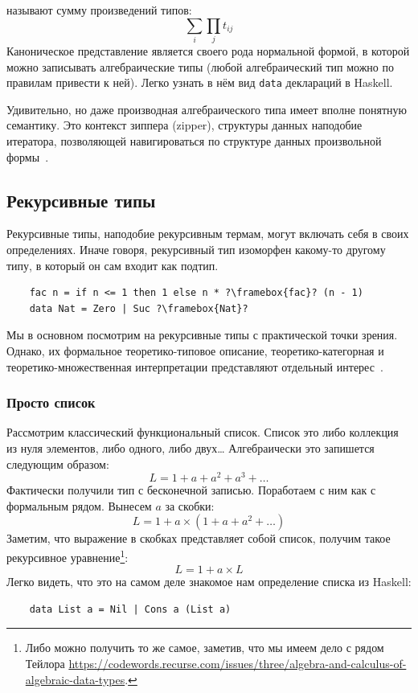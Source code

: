  называют сумму произведений типов:
\[
    \sum_{i}\prod_{j} t_{ij}
\]
Каноническое представление является своего рода нормальной формой, в которой можно записывать алгебраические типы (любой алгебраический тип можно по правилам привести к ней).
Легко узнать в нём вид \texttt{data} деклараций в Haskell.

Удивительно, но даже производная алгебраического типа имеет вполне понятную семантику.
Это контекст зиппера (zipper), структуры данных наподобие итератора, позволяющей навигироваться по структуре данных произвольной формы~\cite{huet1997zipper, mcbride2001derivative, abbott2003derivatives}.

\subsection{Рекурсивные типы} \label{subsec:recursive-types}

Рекурсивные типы, наподобие рекурсивным термам, могут включать себя в своих определениях.
Иначе говоря, рекурсивный тип изоморфен какому-то другому типу, в который он сам входит как подтип.
\begin{verbatim}
    fac n = if n <= 1 then 1 else n * ?\framebox{fac}? (n - 1)
    data Nat = Zero | Suc ?\framebox{Nat}?
\end{verbatim}

Мы в основном посмотрим на рекурсивные типы с практической точки зрения.
Однако, их формальное теоретико-типовое описание, теоретико-категорная и теоретико-множественная интерпретации представляют отдельный интерес~\cite[часть 4]{pierce2002types}.

\subsubsection{Просто список}

Рассмотрим классический функциональный список.
Список это либо коллекция из нуля элементов, либо одного, либо двух\ldots
Алгебраически это запишется следующим образом:
\[
    L = 1 + a + a^2 + a^3 + \ldots
\]
Фактически получили тип с бесконечной записью.
Поработаем с ним как с формальным рядом.
Вынесем $a$ за скобки:
\[
    L = 1 + a \times (1 + a + a^2 + \ldots)
\]
Заметим, что выражение в скобках представляет собой список, получим такое рекурсивное уравнение\footnote{Либо можно получить то же самое, заметив, что мы имеем дело с рядом Тейлора \url{https://codewords.recurse.com/issues/three/algebra-and-calculus-of-algebraic-data-types}.}:
\[
    L = 1 + a \times L
\]
Легко видеть, что это на самом деле знакомое нам определение списка из Haskell:
\begin{verbatim}
    data List a = Nil | Cons a (List a)
\end{verbatim}

